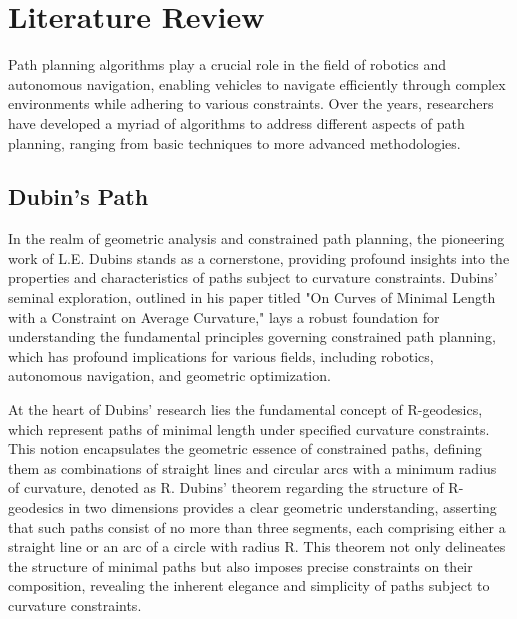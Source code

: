 \section{Literature Review}


Path planning algorithms play a crucial role in the field of robotics and autonomous navigation, enabling vehicles to navigate efficiently through complex environments while adhering to various constraints. Over the years, researchers have developed a myriad of algorithms to address different aspects of path planning, ranging from basic techniques to more advanced methodologies.

\vspace*{6mm}


\vspace*{6mm} 

\subsection{Dubin's Path}

In the realm of geometric analysis and constrained path planning, the pioneering work of L.E. Dubins stands as a cornerstone, providing profound insights into the properties and characteristics of paths subject to curvature constraints. Dubins' seminal exploration, outlined in his paper titled "On Curves of Minimal Length with a Constraint on Average Curvature," lays a robust foundation for understanding the fundamental principles governing constrained path planning, which has profound implications for various fields, including robotics, autonomous navigation, and geometric optimization.

\vspace*{6mm}


At the heart of Dubins' research lies the fundamental concept of R-geodesics, which represent paths of minimal length under specified curvature constraints. This notion encapsulates the geometric essence of constrained paths, defining them as combinations of straight lines and circular arcs with a minimum radius of curvature, denoted as R. Dubins' theorem regarding the structure of R-geodesics in two dimensions provides a clear geometric understanding, asserting that such paths consist of no more than three segments, each comprising either a straight line or an arc of a circle with radius R. This theorem not only delineates the structure of minimal paths but also imposes precise constraints on their composition, revealing the inherent elegance and simplicity of paths subject to curvature constraints.

